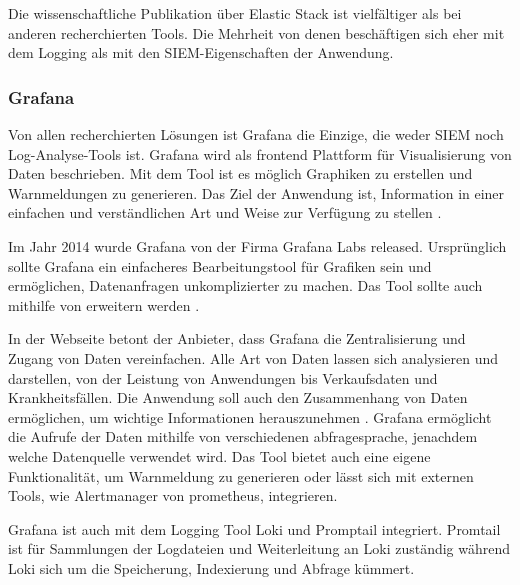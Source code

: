 
Die wissenschaftliche Publikation über Elastic Stack ist vielfältiger als bei anderen recherchierten Tools. Die Mehrheit von denen beschäftigen sich eher mit dem Logging als mit den \gls{SIEM}-Eigenschaften der Anwendung.

\subsubsection{Grafana}
Von allen recherchierten Lösungen ist Grafana die Einzige, die weder \gls{SIEM} noch Log-Analyse-Tools ist. Grafana wird als \gls{frontend} Plattform für Visualisierung von Daten beschrieben. Mit dem Tool ist es möglich Graphiken zu erstellen und Warnmeldungen zu generieren. Das Ziel der Anwendung ist, Information in einer einfachen und verständlichen Art und Weise zur Verfügung zu stellen \citep{redhat_grafana}.

Im Jahr 2014 wurde Grafana von der Firma Grafana Labs released. Ursprünglich sollte Grafana ein einfacheres Bearbeitungstool für Grafiken sein und ermöglichen, Datenanfragen unkomplizierter zu machen. Das Tool sollte auch  mithilfe von  erweitern werden \citep{Oedegaard_historyGrafana}.

In der Webseite betont der Anbieter, dass Grafana die Zentralisierung und Zugang von Daten vereinfachen. Alle Art von Daten lassen sich analysieren und darstellen, von der Leistung von Anwendungen bis Verkaufsdaten und Krankheitsfällen. Die Anwendung soll auch den Zusammenhang von Daten ermöglichen, um wichtige Informationen herauszunehmen \citep{Grafana_Grafana}. Grafana ermöglicht die Aufrufe der Daten mithilfe von verschiedenen \gls{abfragesprache}, jenachdem welche Datenquelle verwendet wird. Das Tool bietet auch eine eigene Funktionalität, um Warnmeldung zu generieren oder lässt sich mit externen Tools, wie Alertmanager von \gls{prometheus}, integrieren. 

Grafana ist auch mit dem Logging Tool Loki und Promptail integriert. Promtail ist für Sammlungen der Logdateien und Weiterleitung an Loki zuständig während Loki sich um die Speicherung, Indexierung und Abfrage kümmert.

